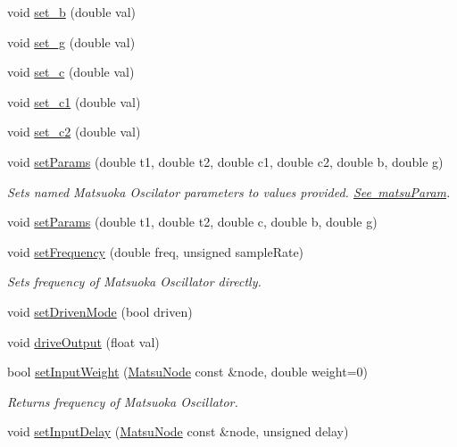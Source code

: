 \begin{DoxyCompactItemize}
void \mbox{\hyperlink{classMatsuNode_a6d67de2da757be9edc89247e8c25b892}{set\+\_\+b}} (double val)
\item 
void \mbox{\hyperlink{classMatsuNode_a4ef14db52c49e5ad16c58f35e6356bd6}{set\+\_\+g}} (double val)
\item 
void \mbox{\hyperlink{classMatsuNode_a9b413bb1cfd2f899be5d6c795c2925d5}{set\+\_\+c}} (double val)
\item 
void \mbox{\hyperlink{classMatsuNode_ac73855b7037577ed6c06dce868d8ab5b}{set\+\_\+c1}} (double val)
\item 
void \mbox{\hyperlink{classMatsuNode_a6bea0b2a8d747f389ceaeb1374e96398}{set\+\_\+c2}} (double val)
\item 
void \mbox{\hyperlink{classMatsuNode_a15b6cfcaa1e20abf04c7c18da3881d60}{set\+Params}} (double t1, double t2, double c1, double c2, double b, double g)
\begin{DoxyCompactList}\small\item\em Sets named Matsuoka Oscilator parameters to values provided. \mbox{\hyperlink{classMatsuNode_aed801e1d0363292efc99bb02f1911386}{See matsu\+Param}}. \end{DoxyCompactList}\item 
void \mbox{\hyperlink{classMatsuNode_ab240f6a290cf33356d9df8fce58633ab}{set\+Params}} (double t1, double t2, double c, double b, double g)
\item 
void \mbox{\hyperlink{classMatsuNode_adb33b1e7dcfaf786be5d99627bca1c14}{set\+Frequency}} (double freq, unsigned sample\+Rate)
\begin{DoxyCompactList}\small\item\em Sets frequency of Matsuoka Oscillator directly. \end{DoxyCompactList}\item 
void \mbox{\hyperlink{classMatsuNode_a62c5dce090102df22142da5cdad313e1}{set\+Driven\+Mode}} (bool driven)
\item 
void \mbox{\hyperlink{classMatsuNode_a64f8db81c0a5df5d7261b36640b399d4}{drive\+Output}} (float val)
\item 
bool \mbox{\hyperlink{classMatsuNode_af8ebc02ac8a69c9ecbb41fa22434a986}{set\+Input\+Weight}} (\mbox{\hyperlink{classMatsuNode}{Matsu\+Node}} const \&node, double weight=0)
\begin{DoxyCompactList}\small\item\em Returns frequency of Matsuoka Oscillator. \end{DoxyCompactList}\item 
void \mbox{\hyperlink{classMatsuNode_a180df69fa13bbb8a0ad1ec56219b540c}{set\+Input\+Delay}} (\mbox{\hyperlink{classMatsuNode}{Matsu\+Node}} const \&node, unsigned delay)

\end{DoxyCompactItemize}
